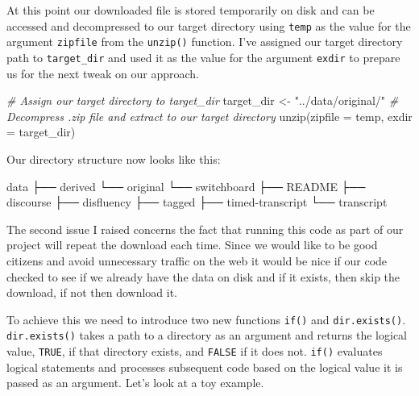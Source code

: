 \documentclass[
]{article}
\newenvironment{Shaded}{\begin{snugshade}}{\end{snugshade}}
\newcommand{\AttributeTok}[1]{\textcolor[rgb]{0.77,0.63,0.00}{#1}}
\newcommand{\CommentTok}[1]{\textcolor[rgb]{0.56,0.35,0.01}{\textit{#1}}}
\newcommand{\ExtensionTok}[1]{#1}
\newcommand{\FunctionTok}[1]{\textcolor[rgb]{0.00,0.00,0.00}{#1}}
\newcommand{\NormalTok}[1]{#1}
\newcommand{\OtherTok}[1]{\textcolor[rgb]{0.56,0.35,0.01}{#1}}
\newcommand{\StringTok}[1]{\textcolor[rgb]{0.31,0.60,0.02}{#1}}
\begin{document}
At this point our downloaded file is stored temporarily on disk and can be accessed and decompressed to our target directory using \texttt{temp} as the value for the argument \texttt{zipfile} from the \texttt{unzip()} function. I've assigned our target directory path to \texttt{target\_dir} and used it as the value for the argument \texttt{exdir} to prepare us for the next tweak on our approach.

\begin{Shaded}
\begin{Highlighting}[]
\CommentTok{\# Assign our target directory to \textasciigrave{}target\_dir\textasciigrave{}}
\NormalTok{target\_dir }\OtherTok{\textless{}{-}} \StringTok{"../data/original/"}
\CommentTok{\# Decompress .zip file and extract to our target directory}
\FunctionTok{unzip}\NormalTok{(}\AttributeTok{zipfile =}\NormalTok{ temp, }\AttributeTok{exdir =}\NormalTok{ target\_dir)}
\end{Highlighting}
\end{Shaded}

Our directory structure now looks like this:

\begin{Shaded}
\begin{Highlighting}[]
\ExtensionTok{data}
\ExtensionTok{├──}\NormalTok{ derived}
\ExtensionTok{└──}\NormalTok{ original}
    \ExtensionTok{└──}\NormalTok{ switchboard}
        \ExtensionTok{├──}\NormalTok{ README}
        \ExtensionTok{├──}\NormalTok{ discourse}
        \ExtensionTok{├──}\NormalTok{ disfluency}
        \ExtensionTok{├──}\NormalTok{ tagged}
        \ExtensionTok{├──}\NormalTok{ timed{-}transcript}
        \ExtensionTok{└──}\NormalTok{ transcript}
\end{Highlighting}
\end{Shaded}

The second issue I raised concerns the fact that running this code as part of our project will repeat the download each time. Since we would like to be good citizens and avoid unnecessary traffic on the web it would be nice if our code checked to see if we already have the data on disk and if it exists, then skip the download, if not then download it.

To achieve this we need to introduce two new functions \texttt{if()} and \texttt{dir.exists()}. \texttt{dir.exists()} takes a path to a directory as an argument and returns the logical value, \texttt{TRUE}, if that directory exists, and \texttt{FALSE} if it does not. \texttt{if()} evaluates logical statements and processes subsequent code based on the logical value it is passed as an argument. Let's look at a toy example.
\end{document}
